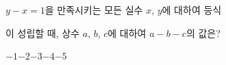 $y-x=1$을 만족시키는 모든 실수 $x$, $y$에 대하여 등식 \par\smallskip{}\par\smallskip\noindent 이 성립할 때, 상수 $a$, $b$, $c$에 대하여 $a-b-c$의 값은?
\begin{choices32}{$-1$}{$-2$}{$-3$}{$-4$}{$-5$}\end{choices32}
